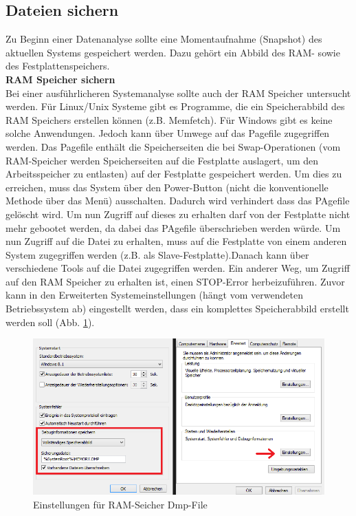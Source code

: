 \subsection{Dateien sichern}
Zu Beginn einer Datenanalyse sollte eine Momentaufnahme (Snapshot) des aktuellen Systems gespeichert werden. Dazu gehört ein Abbild des RAM- sowie des Festplattenspeichers.\\

\noindent\textbf{RAM Speicher sichern}\\
\noindent Bei einer ausführlicheren Systemanalyse sollte auch der RAM Speicher untersucht werden. Für Linux/Unix Systeme gibt es Programme, die ein Speicherabbild des RAM Speichers erstellen können (z.B. Memfetch). Für Windows gibt es keine solche Anwendungen. Jedoch kann über Umwege auf das Pagefile zugegriffen werden. Das Pagefile enthält die Speicherseiten die bei Swap-Operationen (vom RAM-Speicher werden Speicherseiten auf die Festplatte auslagert, um den Arbeitsspeicher zu entlasten) auf der Festplatte gespeichert werden. Um dies zu erreichen, muss das System über den Power-Button (nicht die konventionelle Methode über das Menü) ausschalten. Dadurch wird verhindert dass das PAgefile gelöscht wird. Um nun Zugriff auf dieses zu erhalten darf von der Festplatte nicht mehr gebootet werden, da dabei das PAgefile überschrieben werden würde. Um nun Zugriff auf die Datei zu erhalten, muss auf die Festplatte von einem anderen System zugegriffen werden (z.B. als Slave-Festplatte).Danach kann über verschiedene Tools auf die Datei zugegriffen werden. 
Ein anderer Weg, um Zugriff auf den RAM Speicher zu erhalten ist, einen STOP-Error herbeizuführen. Zuvor kann in den Erweiterten Systemeinstellungen (hängt vom verwendeten Betriebssystem ab) eingestellt werden, dass ein komplettes Speicherabbild erstellt werden soll (Abb. \ref{ram}).\\

\begin{figure}[h]
    \centering\includegraphics[scale=0.5]{Bilder/RAM.png}
  \caption{Einstellungen für RAM-Seicher Dmp-File}
  \label{ram}
\end{figure}

